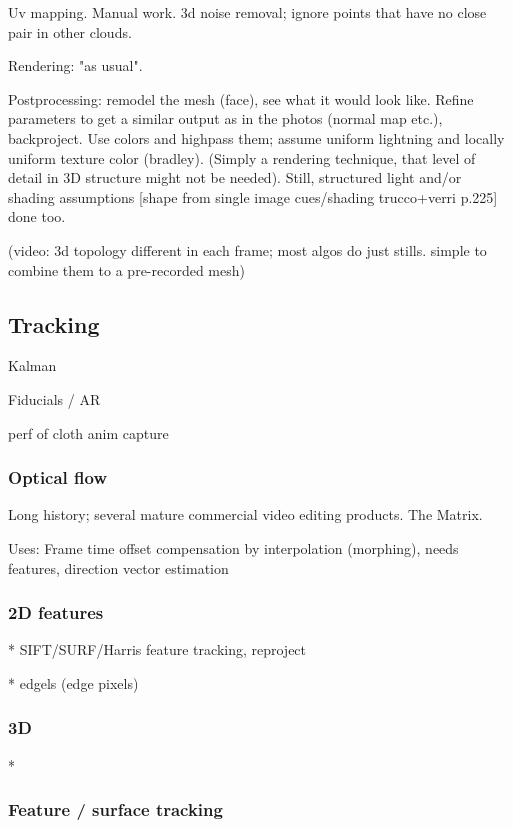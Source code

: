 Uv mapping. Manual work. 3d noise removal; ignore points that have no close pair in other clouds.

Rendering: "as usual".

Postprocessing: remodel the mesh (face), see what it would look like. Refine parameters to get a similar output as in the photos (normal map etc.), backproject. Use colors and highpass them; assume uniform lightning and locally uniform texture color (bradley). (Simply a rendering technique, that level of detail in 3D structure might not be needed). Still, structured light and/or shading assumptions [shape from single image cues/shading trucco+verri p.225] done too.


(video: 3d topology different in each frame; most algos do just stills. simple to combine them to a pre-recorded mesh)


\subsection{Tracking}

Kalman

Fiducials / AR

perf of cloth anim capture
\subsubsection{Optical flow}

Long history; several mature commercial video editing products. The Matrix.

Uses: Frame time offset compensation by interpolation (morphing), needs features, direction vector estimation


\subsubsection{2D features}

* SIFT/SURF/Harris feature tracking, reproject

* edgels (edge pixels)

\subsubsection{3D}

*


\subsubsection{Feature / surface tracking}

